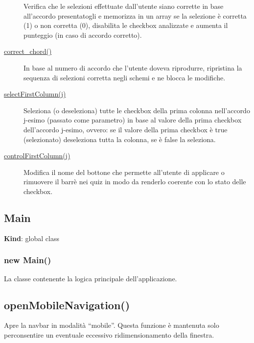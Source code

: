 \begin{description}
Verifica che le selezioni effettuate dall'utente siano corrette in base
all'accordo presentatogli e memorizza in un array se la selezione è
corretta (1) o non corretta (0), disabilita le checkbox analizzate e
aumenta il punteggio (in caso di accordo corretto).
\item[{ \protect\hyperlink{correct_chord}{correct\_chord()} }]
In base al numero di accordo che l'utente doveva riprodurre, ripristina
la sequenza di selezioni corretta negli schemi e ne blocca le modifiche.
\item[{ \protect\hyperlink{selectFirstColumn}{selectFirstColumn(j)} }]
Seleziona (o deseleziona) tutte le checkbox della prima colonna
nell'accordo j-esimo (passato come parametro) in base al valore della
prima checkbox dell'accordo j-esimo, ovvero: se il valore della prima
checkbox è true (selezionato) deseleziona tutta la colonna, se è false
la seleziona.
\item[{ \protect\hyperlink{controlFirstColumn}{controlFirstColumn(j)} }]
Modifica il nome del bottone che permette all'utente di applicare o
rimuovere il barrè nei quiz in modo da renderlo coerente con lo stato
delle checkbox.
\end{description}

\protect\hypertarget{Main}{}{}

\hypertarget{main}{%
\subsection{Main}\label{main}}

\textbf{Kind}: global class\\
\protect\hypertarget{new_Main_new}{}{}

\hypertarget{new-main}{%
\subsubsection{new Main()}\label{new-main}}

La classe contenente la logica principale dell'applicazione.

\protect\hypertarget{openMobileNavigation}{}{}

\hypertarget{openmobilenavigation}{%
\subsection{openMobileNavigation()}\label{openmobilenavigation}}

Apre la navbar in modalità ``mobile''. Questa funzione è mantenuta solo
perconsentire un eventuale eccessivo ridimensionamento della finestra.


